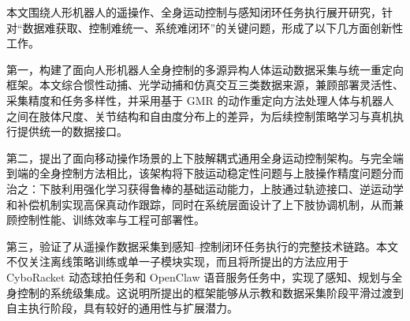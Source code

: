 
\begin{innovations}

本文围绕人形机器人的遥操作、全身运动控制与感知闭环任务执行展开研究，针对“数据难获取、控制难统一、系统难闭环”的关键问题，形成了以下几方面创新性工作。

第一，构建了面向人形机器人全身控制的多源异构人体运动数据采集与统一重定向框架。本文综合惯性动捕、光学动捕和仿真交互三类数据来源，兼顾部署灵活性、采集精度和任务多样性，并采用基于 GMR 的动作重定向方法处理人体与机器人之间在肢体尺度、关节结构和自由度分布上的差异，为后续控制策略学习与真机执行提供统一的数据接口。

第二，提出了面向移动操作场景的上下肢解耦式通用全身运动控制架构。与完全端到端的全身控制方法相比，该架构将下肢运动稳定性问题与上肢操作精度问题分而治之：下肢利用强化学习获得鲁棒的基础运动能力，上肢通过轨迹接口、逆运动学和补偿机制实现高保真动作跟踪，同时在系统层面设计了上下肢协调机制，从而兼顾控制性能、训练效率与工程可部署性。

第三，验证了从遥操作数据采集到感知--控制闭环任务执行的完整技术链路。本文不仅关注离线策略训练或单一子模块实现，而且将所提出的方法应用于 CyboRacket 动态球拍任务和 OpenClaw 语音服务任务中，实现了感知、规划与全身控制的系统级集成。这说明所提出的框架能够从示教和数据采集阶段平滑过渡到自主执行阶段，具有较好的通用性与扩展潜力。

\end{innovations}


%
%
%
